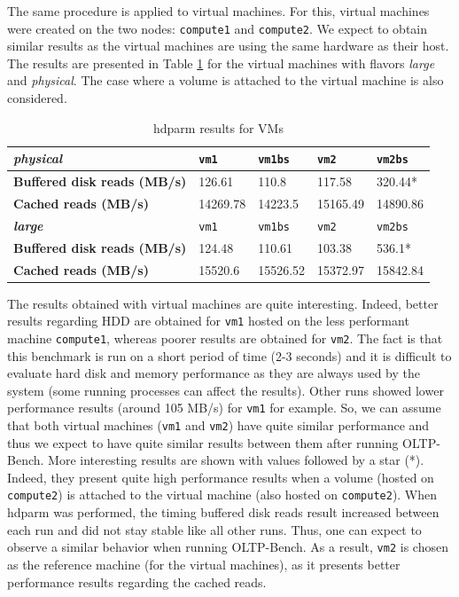The same procedure is applied to virtual machines.
For this, virtual machines were created on the two nodes: \texttt{compute1} and \texttt{compute2}.
We expect to obtain similar results as the virtual machines are using the same hardware as their host.
The results are presented in Table \ref{table:hdparm_res_VM} for the virtual machines with flavors \textit{large} and \textit{physical}. The case where a volume is attached to the virtual machine is also considered.

\begin{table}[h]
	\centering
	\begin{tabular}{|m{6.5cm}|m{1.5cm}|m{1.5cm}|m{1.5cm}|m{1.5cm}|}
		\hline
		\textbf{\textit{physical}} & 
		\texttt{vm1} & 
		\texttt{vm1bs} & 
		\texttt{vm2} & 
		\texttt{vm2bs} \\
		\hline
		\textbf{Buffered disk reads (MB/s)} & 
		126.61 & 
		110.8 & 
		117.58 & 
		320.44* \\
		\hline
		\textbf{Cached reads (MB/s)} &  
		14269.78 & 
		14223.5 & 
		15165.49 & 
		14890.86 \\
		\hline\hline
		\textbf{\textit{large}} & 
		\texttt{vm1} & 
		\texttt{vm1bs} & 
		\texttt{vm2} & 
		\texttt{vm2bs} \\
		\hline
		\textbf{Buffered disk reads (MB/s)} & 
		124.48 & 
		110.61 & 
		103.38 & 
		536.1* \\
		\hline
		\textbf{Cached reads (MB/s)} &  
		15520.6 & 
		15526.52 & 
		15372.97 & 
		15842.84 \\
		\hline
	\end{tabular}
	\caption{hdparm results for VMs}
	\label{table:hdparm_res_VM}
\end{table}

The results obtained with virtual machines are quite interesting.
Indeed, better results regarding HDD are obtained for \texttt{vm1} hosted on the less performant machine \texttt{compute1}, whereas poorer results are obtained for \texttt{vm2}.
The fact is that this benchmark is run on a short period of time (2-3 seconds) and 
it is difficult to evaluate hard disk and memory performance as they are always used by the system (some running processes can affect the results). 
Other runs showed lower performance results (around 105 MB/s) for \texttt{vm1} for example.
So, we can assume that both virtual machines (\texttt{vm1} and \texttt{vm2}) have quite similar performance and thus we expect to have quite similar results between them after running OLTP-Bench.
More interesting results are shown with values followed by a star (*). 
Indeed, they present quite high performance results when a volume (hosted on \texttt{compute2}) is attached to the virtual machine (also hosted on \texttt{compute2}).
When hdparm was performed, the timing buffered disk reads result increased between each run and did not stay stable like all other runs.
Thus, one can expect to observe a similar behavior when running OLTP-Bench.
As a result, \texttt{vm2} is chosen as the reference machine (for the virtual machines), as it presents better performance results regarding the cached reads.


